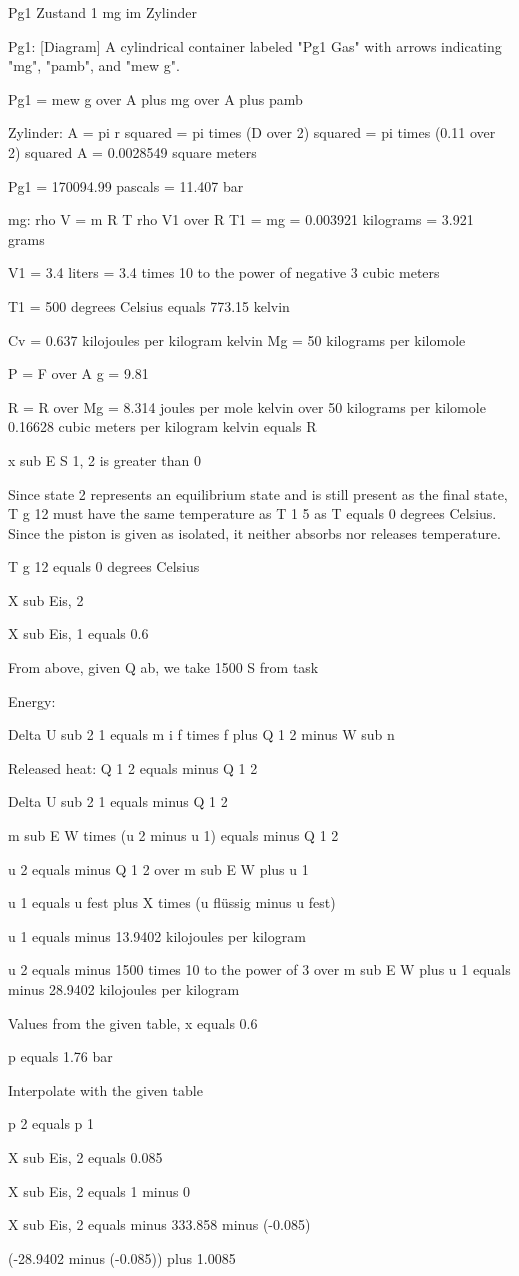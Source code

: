 Pg1 Zustand 1
mg im Zylinder

Pg1:
[Diagram] A cylindrical container labeled "Pg1 Gas" with arrows indicating "mg", "pamb", and "mew g".

Pg1 = mew g over A plus mg over A plus pamb

Zylinder:
A = pi r squared = pi times (D over 2) squared
= pi times (0.11 over 2) squared
A = 0.0028549 square meters

Pg1 = 170094.99 pascals
= 11.407 bar

mg:
rho V = m R T
rho V1 over R T1 = mg = 0.003921 kilograms
= 3.921 grams

V1 = 3.4 liters
= 3.4 times 10 to the power of negative 3 cubic meters

T1 = 500 degrees Celsius equals 773.15 kelvin

Cv = 0.637 kilojoules per kilogram kelvin
Mg = 50 kilograms per kilomole

P = F over A
g = 9.81

R = R over Mg = 8.314 joules per mole kelvin over 50 kilograms per kilomole
0.16628 cubic meters per kilogram kelvin equals R

x sub E S 1, 2 is greater than 0

Since state 2 represents an equilibrium state and is still present as the final state, T g 12 must have the same temperature as T 1 5 as T equals 0 degrees Celsius. Since the piston is given as isolated, it neither absorbs nor releases temperature.

T g 12 equals 0 degrees Celsius

X sub Eis, 2

X sub Eis, 1 equals 0.6

From above, given Q ab, we take 1500 S from task

Energy:

Delta U sub 2 1 equals m i f times f plus Q 1 2 minus W sub n

Released heat: Q 1 2 equals minus Q 1 2

Delta U sub 2 1 equals minus Q 1 2

m sub E W times (u 2 minus u 1) equals minus Q 1 2

u 2 equals minus Q 1 2 over m sub E W plus u 1

u 1 equals u fest plus X times (u flüssig minus u fest)

u 1 equals minus 13.9402 kilojoules per kilogram

u 2 equals minus 1500 times 10 to the power of 3 over m sub E W plus u 1 equals minus 28.9402 kilojoules per kilogram

Values from the given table, x equals 0.6

p equals 1.76 bar

Interpolate with the given table

p 2 equals p 1

X sub Eis, 2 equals 0.085

X sub Eis, 2 equals 1 minus 0

X sub Eis, 2 equals minus 333.858 minus (-0.085)

(-28.9402 minus (-0.085)) plus 1.0085